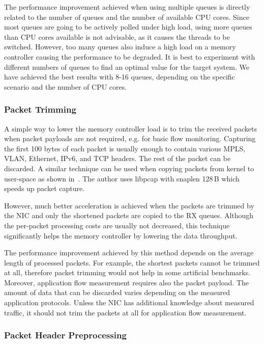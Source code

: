 The performance improvement achieved when using multiple queues is directly related to the number of queues and the number of available CPU cores. Since most queues are going to be actively polled under high load, using more queues than CPU cores available is not advisable, as it causes the threads to be switched. However, too many queues also induce a high load on a memory controller causing the performance to be degraded. It is best to experiment with different numbers of queues to find an optimal value for the target system. We have achieved the best results with 8-16 queues, depending on the specific scenario and the number of CPU cores.

\subsubsection{Packet Trimming}

A simple way to lower the memory controller load is to trim the received packets when packet payloads are not required, e.g. for basic flow monitoring. Capturing the first 100 bytes of each packet is usually enough to contain various MPLS, VLAN, Ethernet, IPv6, and TCP headers. The rest of the packet can be discarded. A similar technique can be used when copying packets from kernel to user-space as shown in~\cite{Deri-2004-Improving}. The author uses libpcap with snaplen 128\,B which speeds up packet capture.

However, much better acceleration is achieved when the packets are trimmed by the NIC and only the shortened packets are copied to the RX queues. Although the per-packet processing costs are usually not decreased, this technique significantly helps the memory controller by lowering the data throughput. 

The performance improvement achieved by this method depends on the average length of processed packets. For example, the shortest packets cannot be trimmed at all, therefore packet trimming would not help in some artificial benchmarks. Moreover, application flow measurement requires also the packet payload. The amount of data that can be discarded varies depending on the measured application protocols. Unless the NIC has additional knowledge about measured traffic, it should not trim the packets at all for application flow measurement.

\subsubsection{Packet Header Preprocessing}

